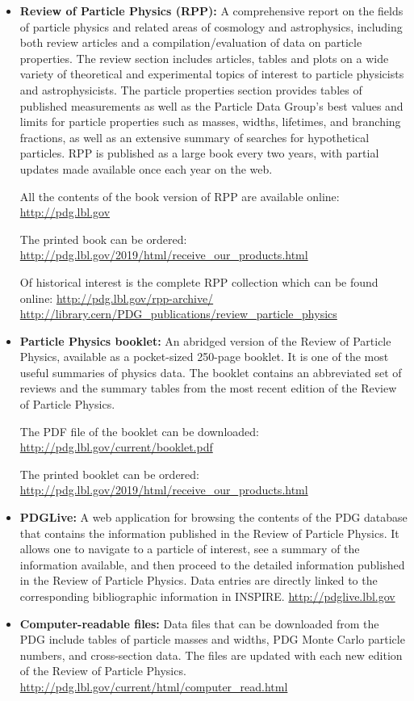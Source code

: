 \begin{itemize}
\item
  \textbf{Review of Particle Physics (RPP):} A comprehensive report on
  the fields of particle physics and related areas of cosmology and
  astrophysics, including both review articles and a
  compilation/evaluation of data on particle properties. The review
  section includes articles, tables and plots on a wide variety of
  theoretical and experimental topics of interest to particle physicists
  and astrophysicists. The particle properties section provides tables
  of published measurements as well as the Particle Data Group's best
  values and limits for particle properties such as masses, widths,
  lifetimes, and branching fractions, as well as an extensive summary of
  searches for hypothetical particles. RPP is published as a large book
  every two years, with partial updates made available once each year on
  the web.

  All the contents of the book version of RPP are available online:
  \url{http://pdg.lbl.gov}

  The printed book can be ordered:
  \url{http://pdg.lbl.gov/2019/html/receive_our_products.html}

  Of historical interest is the complete RPP collection which can be
  found online: \url{http://pdg.lbl.gov/rpp-archive/}
  \url{http://library.cern/PDG_publications/review_particle_physics}
\item
  \textbf{Particle Physics booklet:} An abridged version of the Review
  of Particle Physics, available as a pocket-sized 250-page booklet. It
  is one of the most useful summaries of physics data. The booklet
  contains an abbreviated set of reviews and the summary tables from the
  most recent edition of the Review of Particle Physics.

  The PDF file of the booklet can be downloaded:
  \url{http://pdg.lbl.gov/current/booklet.pdf}

  The printed booklet can be ordered:
  \url{http://pdg.lbl.gov/2019/html/receive_our_products.html}
\item
{}
  \textbf{PDGLive:} A web application for browsing the contents of the
  PDG database that contains the information published in the Review of
  Particle Physics. It allows one to navigate to a particle of interest,
  see a summary of the information available, and then proceed to the
  detailed information published in the Review of Particle Physics. Data
  entries are directly linked to the corresponding bibliographic
  information in INSPIRE. \url{http://pdglive.lbl.gov}
\item
{}
  \textbf{Computer-readable files:} Data files that can be downloaded
  from the PDG include tables of particle masses and widths, PDG Monte
  Carlo particle numbers, and cross-section data. The files are updated
  with each new edition of the Review of Particle Physics.
  \url{http://pdg.lbl.gov/current/html/computer_read.html}
\end{itemize}

